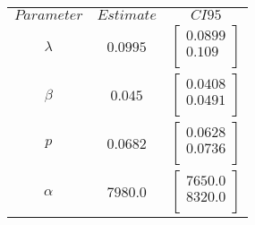 \begin{tabular}{ccc}
$Parameter$ & $Estimate$ & $CI95$\\
$\lambda$ & $0.0995$ & $\left[
\begin{array}{c}
0.0899 \\
0.109 \\
\end{array}
\right]$\\
$\beta$ & $0.045$ & $\left[
\begin{array}{c}
0.0408 \\
0.0491 \\
\end{array}
\right]$\\
$p$ & $0.0682$ & $\left[
\begin{array}{c}
0.0628 \\
0.0736 \\
\end{array}
\right]$\\
$\alpha$ & $7980.0$ & $\left[
\begin{array}{c}
7650.0 \\
8320.0 \\
\end{array}
\right]$\\
\end{tabular}
